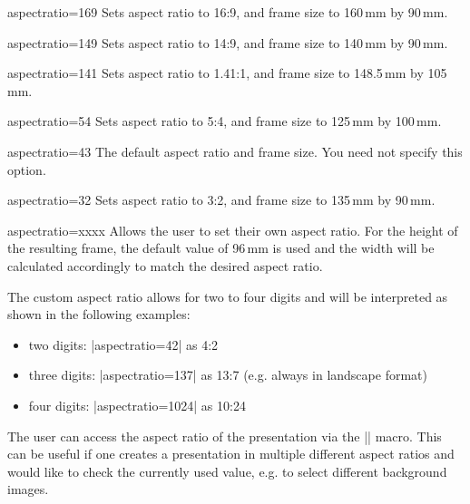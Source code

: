\begin{classoption}{aspectratio=169}
  Sets aspect ratio to 16:9, and frame size to 160\,mm by 90\,mm.
\end{classoption}

\begin{classoption}{aspectratio=149}
  Sets aspect ratio to 14:9, and frame size to 140\,mm by 90\,mm.
\end{classoption}

\begin{classoption}{aspectratio=141}
  Sets aspect ratio to 1.41:1, and frame size to 148.5\,mm by 105\,mm.
\end{classoption}

\begin{classoption}{aspectratio=54}
  Sets aspect ratio to 5:4, and frame size to 125\,mm by 100\,mm.
\end{classoption}

\begin{classoption}{aspectratio=43}
  The default aspect ratio and frame size. You need not specify this option.
\end{classoption}

\begin{classoption}{aspectratio=32}
  Sets aspect ratio to 3:2, and frame size to 135\,mm by 90\,mm.
\end{classoption}

\begin{classoption}{aspectratio=xxxx}
  Allows the user to set their own aspect ratio. For the height of the resulting frame, the default value of 96\,mm is used and the width will be calculated accordingly to match the desired aspect ratio.
  
  The custom aspect ratio allows for two to four digits and will be interpreted as shown in the following examples:
  \begin{itemize}
    \item two digits: |aspectratio=42| as 4:2
    \item three digits: |aspectratio=137| as 13:7 (e.g. always in landscape format)
    \item four digits: |aspectratio=1024| as 10:24
  \end{itemize} 
\end{classoption}

\begin{command}{\insertaspectratio}
  The user can access the aspect ratio of the presentation via the |\insertaspectratio| macro. This can be useful if one creates a presentation in multiple different aspect ratios and would like to check the currently used value, e.g. to select different background images.
\end{command}

